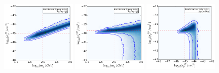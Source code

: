 \begin{figure}[p!]
  \centering
  \includegraphics[trim=0.2cm 0.2cm 0.2cm 0.2cm, clip,width=0.32\textwidth]{NT/BenchmarkA_poly_noIC-mx_sigsi.pdf}
  \includegraphics[trim=0.2cm 0.2cm 0.2cm 0.2cm, clip,width=0.32\textwidth]{NT/BenchmarkA_poly_noIC-mx_sigsd.pdf}
  \includegraphics[trim=0.2cm 0.2cm 0.2cm 0.2cm, clip,width=0.32\textwidth]{NT/BenchmarkA_poly_noIC-sigsi_sigsd.pdf}


\end{figure}
